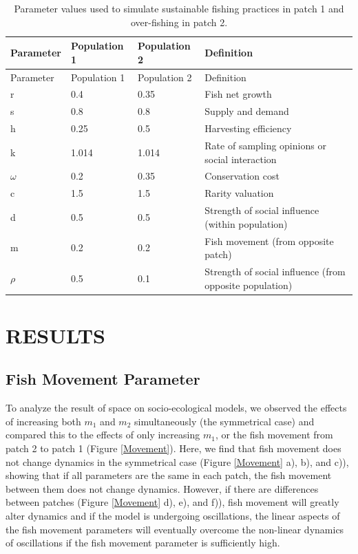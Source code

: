 \documentclass[
  12pt,
]{article}
\begin{document}
\begin{longtable}[]{@{}llll@{}}
\caption{\label{tab:DispersionParamTable}Parameter values used to simulate sustainable fishing practices in patch 1 and over-fishing in patch 2. \label{DispersionParamTable}}\tabularnewline
\toprule\noalign{}
Parameter & Population 1 & Population 2 & Definition \\
\midrule\noalign{}
\endfirsthead
\toprule\noalign{}
Parameter & Population 1 & Population 2 & Definition \\
\midrule\noalign{}
\endhead
\bottomrule\noalign{}
\endlastfoot
r & 0.4 & 0.35 & Fish net growth \\
s & 0.8 & 0.8 & Supply and demand \\
h & 0.25 & 0.5 & Harvesting efficiency \\
k & 1.014 & 1.014 & Rate of sampling opinions or social interaction \\
\(\omega\) & 0.2 & 0.35 & Conservation cost \\
c & 1.5 & 1.5 & Rarity valuation \\
d & 0.5 & 0.5 & Strength of social influence (within population) \\
m & 0.2 & 0.2 & Fish movement (from opposite patch) \\
\(\rho\) & 0.5 & 0.1 & Strength of social influence (from opposite population) \\
\end{longtable}

\section{RESULTS}\label{results}

\subsection{\texorpdfstring{ Fish Movement Parameter}{ Fish Movement Parameter}}\label{fish-movement-parameter}

To analyze the result of space on socio-ecological models, we observed the effects of increasing both \(m_1\) and \(m_2\) simultaneously (the symmetrical case) and compared this to the effects of only increasing \(m_1\), or the fish movement from patch 2 to patch 1 (Figure \ref{Movement}). Here, we find that fish movement does not change dynamics in the symmetrical case (Figure \ref{Movement} a), b), and c)), showing that if all parameters are the same in each patch, the fish movement between them does not change dynamics. However, if there are differences between patches (Figure \ref{Movement} d), e), and f)), fish movement will greatly alter dynamics and if the model is undergoing oscillations, the linear aspects of the fish movement parameters will eventually overcome the non-linear dynamics of oscillations if the fish movement parameter is sufficiently high.
\end{document}
